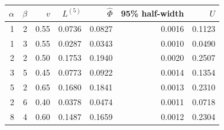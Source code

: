 \begin{tabular}{rrrrrrr}
\toprule
$\alpha$ & $\beta$ & $v$ & $L^{(5)}$ & $\hat{\Phi}$ & 95\% half-width & $U$ \\
\midrule
1 & 2 & 0.55 & 0.0736 & 0.0827 & 0.0016 & 0.1123 \\
1 & 3 & 0.55 & 0.0287 & 0.0343 & 0.0010 & 0.0490 \\
2 & 2 & 0.50 & 0.1753 & 0.1940 & 0.0020 & 0.2507 \\
3 & 5 & 0.45 & 0.0773 & 0.0922 & 0.0014 & 0.1354 \\
5 & 2 & 0.65 & 0.1680 & 0.1841 & 0.0013 & 0.2310 \\
2 & 6 & 0.40 & 0.0378 & 0.0474 & 0.0011 & 0.0718 \\
8 & 4 & 0.60 & 0.1487 & 0.1659 & 0.0012 & 0.2304 \\
\bottomrule
\end{tabular}
